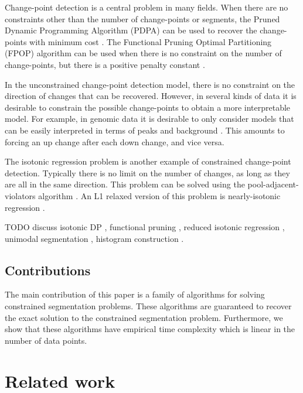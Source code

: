 \documentclass{article}
\begin{document}
Change-point detection is a central problem in many fields. When there
are no constraints other than the number of change-points or segments,
the Pruned Dynamic Programming Algorithm (PDPA) can be used to recover
the change-points with minimum cost \citep{pruned-dp}. The Functional
Pruning Optimal Partitioning (FPOP) algorithm can be used when there
is no constraint on the number of change-points, but there is a
positive penalty constant \citep{FPOP}. 

In the unconstrained change-point detection model, there is no
constraint on the direction of changes that can be recovered. However,
in several kinds of data it is desirable to constrain the possible
change-points to obtain a more interpretable model. For example, in
genomic data it is desirable to only consider models that can be
easily interpreted in terms of peaks and background
\citep{HOCKING-PeakSeg}. This amounts to forcing an up change after each down
change, and vice versa.

The isotonic regression problem is another example of constrained
change-point detection. Typically there is no limit on the number of
changes, as long as they are all in the same direction. This problem
can be solved using the pool-adjacent-violators algorithm
\citep{mair2009isotone}. An L1 relaxed version of this problem is
nearly-isotonic regression \citep{tibshirani2011nearly}.

TODO discuss isotonic DP \citep{isotonic-dp}, functional pruning
\citep{phd-johnson}, reduced isotonic regression
\citep{hardwick2014optimal, reduced-monotonic-regression}, unimodal
segmentation \citep{haiminen2008algorithms}, histogram construction
\citep{halim2009fast}.

\subsection{Contributions}

The main contribution of this paper is a family of algorithms for
solving constrained segmentation problems. These algorithms are
guaranteed to recover the exact solution to the constrained
segmentation problem. Furthermore, we show that these algorithms have
empirical time complexity which is linear in the number of data
points.

\section{Related work}
\label{sec:related}
\end{document}
